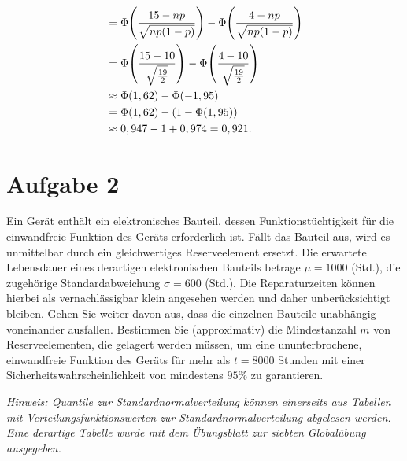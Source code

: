 \documentclass{exercise}
\begin{document}
\begin{enumerate}
\begin{align*}
            &= \Phi\parentheses*{\frac{15 - np}{\sqrt{np\parentheses*{1 - p}}}} - \Phi\parentheses*{\frac{4 - np}{\sqrt{np\parentheses*{1 - p}}}}\\
            &= \Phi\parentheses*{\frac{15 - 10}{\sqrt{\frac{19}{2}}}} - \Phi\parentheses*{\frac{4 - 10}{\sqrt{\frac{19}{2}}}}\\
            &\approx \Phi\parentheses*{1,62} - \Phi\parentheses*{-1,95}\\
            &= \Phi\parentheses*{1,62} - \parentheses*{1 - \Phi\parentheses*{1,95}}\\
            &\approx 0,947 - 1 + 0,974 = 0,921.
        \end{align*}
    \end{enumerate}
    
    
    \section*{Aufgabe 2}
    
    \begin{problem}
        Ein Gerät enthält ein elektronisches Bauteil, dessen Funktionstüchtigkeit für die einwandfreie Funktion des Geräts erforderlich ist.
        Fällt das Bauteil aus, wird es unmittelbar durch ein gleichwertiges Reserveelement ersetzt.
        Die erwartete Lebensdauer eines derartigen elektronischen Bauteils betrage \(\mu = 1000\) (Std.), die zugehörige Standardabweichung \(\sigma = 600\) (Std.).
        Die Reparaturzeiten können hierbei als vernachlässigbar klein angesehen werden und daher unberücksichtigt bleiben.
        Gehen Sie weiter davon aus, dass die einzelnen Bauteile unabhängig voneinander ausfallen.
        Bestimmen Sie (approximativ) die Mindestanzahl \(m\) von Reserveelementen, die gelagert werden müssen, um eine ununterbrochene, einwandfreie Funktion des Geräts für mehr als \(t = 8000\) Stunden mit einer Sicherheitswahrscheinlichkeit von mindestens \(95\%\) zu garantieren.
        
        \emph{Hinweis: Quantile zur Standardnormalverteilung können einerseits aus Tabellen mit Verteilungsfunktionswerten zur Standardnormalverteilung abgelesen werden.
        Eine derartige Tabelle wurde mit dem Übungsblatt zur siebten Globalübung ausgegeben.}
    \end{problem}
    
\end{document}
